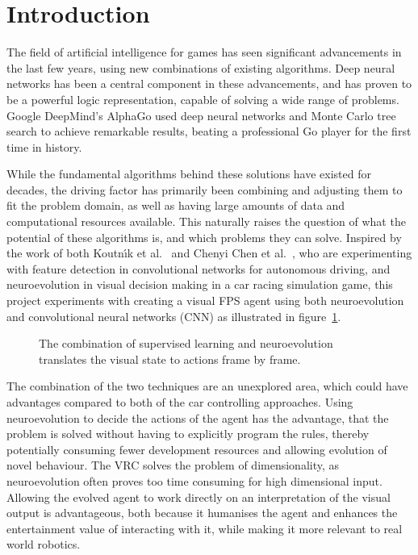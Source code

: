 
\section{Introduction}
The field of artificial intelligence for games has seen significant advancements in the last few years, using new combinations of existing algorithms. Deep neural networks has been a central component in these advancements, and has proven to be a powerful logic representation, capable of solving a wide range of problems. Google DeepMind's AlphaGo\cite{christian} used deep neural networks and Monte Carlo tree search to achieve remarkable results, beating a professional Go player for the first time in history.

While the fundamental algorithms behind these solutions have existed for decades, the driving factor has primarily been combining and adjusting them to fit the problem domain, as well as having large amounts of data and computational resources available. This naturally raises the question of what the potential of these algorithms is, and which problems they can solve. Inspired by the work of both Koutn\'{\i}k et al.~\cite{torcs} and Chenyi Chen et al.~\cite{chen}, who are experimenting with feature detection in convolutional networks for autonomous driving, and neuroevolution in visual decision making in a car racing simulation game, this project experiments with creating a visual FPS agent using both neuroevolution and convolutional neural networks (CNN) as illustrated in figure~\ref{fig:architecture}.

\begin{figure}[H]
	\begin{scriptsize}
		\sffamily
		\def\svgwidth{\textwidth}
		
		\vspace{-45mm}
	\end{scriptsize}
	\caption{The combination of supervised learning and neuroevolution translates the visual state to actions frame by frame.}
	\label{fig:architecture}
\end{figure}

The combination of the two techniques are an unexplored area, which could have advantages compared to both of the car controlling approaches. Using neuroevolution to decide the actions of the agent has the advantage, that the problem is solved without having to explicitly program the rules, thereby potentially consuming fewer development resources and allowing evolution of novel behaviour. The VRC solves the problem of dimensionality, as neuroevolution often proves too time consuming for high dimensional input. Allowing the evolved agent to work directly on an interpretation of the visual output is advantageous, both because it humanises the agent and enhances the entertainment value of interacting with it, while making it more relevant to real world robotics. 

